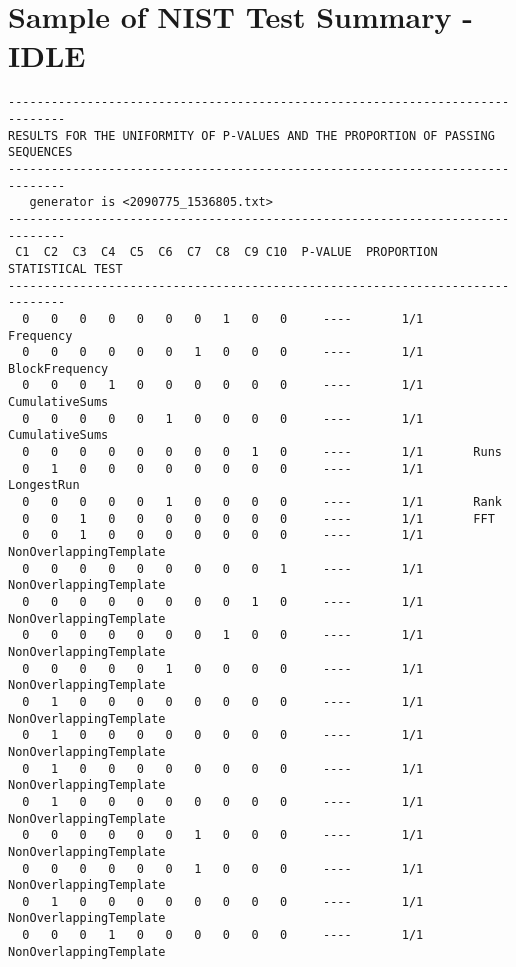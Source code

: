 \chapter{Sample of NIST Test Summary - IDLE}\label{adx:nist_summary_sample_idle}
\begin{code}
    \begin{verbatim}
------------------------------------------------------------------------------
RESULTS FOR THE UNIFORMITY OF P-VALUES AND THE PROPORTION OF PASSING SEQUENCES
------------------------------------------------------------------------------
   generator is <2090775_1536805.txt>
------------------------------------------------------------------------------
 C1  C2  C3  C4  C5  C6  C7  C8  C9 C10  P-VALUE  PROPORTION  STATISTICAL TEST
------------------------------------------------------------------------------
  0   0   0   0   0   0   0   1   0   0     ----       1/1       Frequency
  0   0   0   0   0   0   1   0   0   0     ----       1/1       BlockFrequency
  0   0   0   1   0   0   0   0   0   0     ----       1/1       CumulativeSums
  0   0   0   0   0   1   0   0   0   0     ----       1/1       CumulativeSums
  0   0   0   0   0   0   0   0   1   0     ----       1/1       Runs
  0   1   0   0   0   0   0   0   0   0     ----       1/1       LongestRun
  0   0   0   0   0   1   0   0   0   0     ----       1/1       Rank
  0   0   1   0   0   0   0   0   0   0     ----       1/1       FFT
  0   0   1   0   0   0   0   0   0   0     ----       1/1       NonOverlappingTemplate
  0   0   0   0   0   0   0   0   0   1     ----       1/1       NonOverlappingTemplate
  0   0   0   0   0   0   0   0   1   0     ----       1/1       NonOverlappingTemplate
  0   0   0   0   0   0   0   1   0   0     ----       1/1       NonOverlappingTemplate
  0   0   0   0   0   1   0   0   0   0     ----       1/1       NonOverlappingTemplate
  0   1   0   0   0   0   0   0   0   0     ----       1/1       NonOverlappingTemplate
  0   1   0   0   0   0   0   0   0   0     ----       1/1       NonOverlappingTemplate
  0   1   0   0   0   0   0   0   0   0     ----       1/1       NonOverlappingTemplate
  0   1   0   0   0   0   0   0   0   0     ----       1/1       NonOverlappingTemplate
  0   0   0   0   0   0   1   0   0   0     ----       1/1       NonOverlappingTemplate
  0   0   0   0   0   0   1   0   0   0     ----       1/1       NonOverlappingTemplate
  0   1   0   0   0   0   0   0   0   0     ----       1/1       NonOverlappingTemplate
  0   0   0   1   0   0   0   0   0   0     ----       1/1       NonOverlappingTemplate

\end{verbatim}
\end{code}
